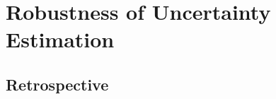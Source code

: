 \chapter{Robustness of Uncertainty Estimation}
\label{chap:robustness}








\section*{Retrospective}
%